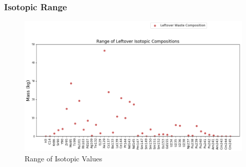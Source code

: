 \begin{frame}
  \frametitle{Isotopic Range}
  \begin{figure}
  	\centering
  	\includegraphics[width=0.9\linewidth]{isotopic-comp-range}
  	\caption{Range of Isotopic Values}
  	\label{fig:isotopic-range}
  \end{figure}
\end{frame}

